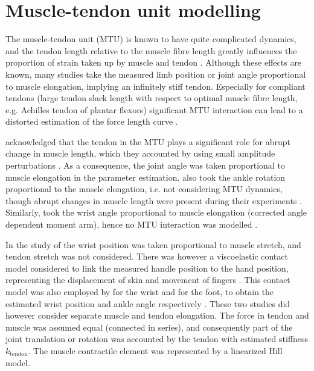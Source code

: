 \section{Muscle-tendon unit modelling}
The muscle-tendon unit (MTU) is known to have quite complicated dynamics, and the tendon length relative to the muscle fibre length greatly influences the proportion of strain taken up by muscle and tendon \cite{zajac_muscle_1989}. Although these effects are known, many studies take the measured limb position or joint angle proportional to muscle elongation, implying an infinitely stiff tendon. Especially for compliant tendons (large tendon slack length with respect to  optimal muscle fibre length, e.g. Achilles tendon of plantar flexors) significant MTU interaction can lead to a distorted estimation of the force length curve \cite{zajac_muscle_1989}. 

\citeauthor{zhang_simultaneous_1997} acknowledged that the tendon in the MTU plays a significant role for abrupt change in muscle length, which they accounted by using small amplitude perturbations \cite{zhang_simultaneous_1997}. As a consequence, the joint angle was taken proportional to muscle elongation in the parameter estimation. \citeauthor{mirbagheri_intrinsic_2000} also took the ankle rotation proportional to the muscle elongation, i.e. not considering MTU dynamics, though abrupt changes in muscle length were present during their experiments \cite{mirbagheri_intrinsic_2000}. Similarly, \citeauthor{de_gooijer-van_de_groep_estimation_2016} took the wrist angle proportional to muscle elongation (corrected angle dependent moment arm), hence no MTU interaction was modelled \cite{de_gooijer-van_de_groep_estimation_2016}. 

In the study of \citeauthor{van_der_helm_identification_2002} the wrist position was taken proportional to muscle stretch, and tendon stretch was not considered. There was however a viscoelastic contact model considered to link the measured handle position to the hand position, representing the displacement of skin and movement of fingers \cite{van_der_helm_identification_2002}. This contact model was also employed by \citeauthor{schouten_nmclab_2008} for the wrist and \citeauthor{mugge_rigorous_2010} for the foot, to obtain the estimated wrist position and ankle angle respectively \cite{schouten_nmclab_2008,mugge_rigorous_2010}. These two studies did however consider separate muscle and tendon elongation. The force in tendon and muscle was assumed equal (connected in series), and consequently part of the joint translation or rotation was accounted by the tendon with estimated stiffness $k_\text{tendon}$. The muscle contractile element was represented by a linearized Hill model. 



